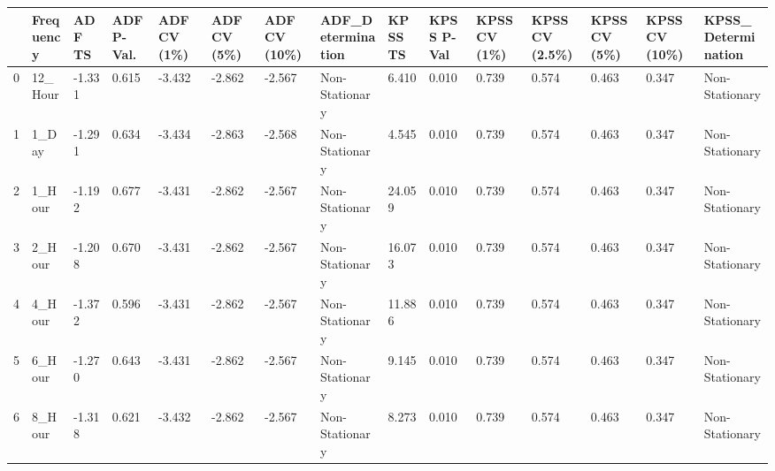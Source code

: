 \begin{tabular}{lllllllllllllll}
\toprule
 & Frequency & ADF TS & ADF P-Val. & ADF CV (1\%) & ADF CV (5\%) & ADF CV (10\%) & ADF_Determination & KPSS TS & KPSS P-Val & KPSS CV (1\%) & KPSS CV (2.5\%) & KPSS CV (5\%) & KPSS CV (10\%) & KPSS_Determination \\
\midrule
0 & 12_Hour & -1.331 & 0.615 & -3.432 & -2.862 & -2.567 & Non-Stationary & 6.410 & 0.010 & 0.739 & 0.574 & 0.463 & 0.347 & Non-Stationary \\
1 & 1_Day & -1.291 & 0.634 & -3.434 & -2.863 & -2.568 & Non-Stationary & 4.545 & 0.010 & 0.739 & 0.574 & 0.463 & 0.347 & Non-Stationary \\
2 & 1_Hour & -1.192 & 0.677 & -3.431 & -2.862 & -2.567 & Non-Stationary & 24.059 & 0.010 & 0.739 & 0.574 & 0.463 & 0.347 & Non-Stationary \\
3 & 2_Hour & -1.208 & 0.670 & -3.431 & -2.862 & -2.567 & Non-Stationary & 16.073 & 0.010 & 0.739 & 0.574 & 0.463 & 0.347 & Non-Stationary \\
4 & 4_Hour & -1.372 & 0.596 & -3.431 & -2.862 & -2.567 & Non-Stationary & 11.886 & 0.010 & 0.739 & 0.574 & 0.463 & 0.347 & Non-Stationary \\
5 & 6_Hour & -1.270 & 0.643 & -3.431 & -2.862 & -2.567 & Non-Stationary & 9.145 & 0.010 & 0.739 & 0.574 & 0.463 & 0.347 & Non-Stationary \\
6 & 8_Hour & -1.318 & 0.621 & -3.432 & -2.862 & -2.567 & Non-Stationary & 8.273 & 0.010 & 0.739 & 0.574 & 0.463 & 0.347 & Non-Stationary \\
\bottomrule
\end{tabular}
